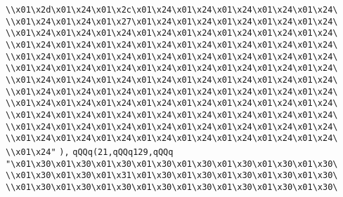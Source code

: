 \verb|\\x01\x2d\x01\x24\x01\x2c\x01\x24\x01\x24\x01\x24\x01\x24\x01\x24\|\newline
\verb|\\x01\x24\x01\x24\x01\x27\x01\x24\x01\x24\x01\x24\x01\x24\x01\x24\|\newline
\verb|\\x01\x24\x01\x24\x01\x24\x01\x24\x01\x24\x01\x24\x01\x24\x01\x24\|\newline
\verb|\\x01\x24\x01\x24\x01\x24\x01\x24\x01\x24\x01\x24\x01\x24\x01\x24\|\newline
\verb|\\x01\x24\x01\x24\x01\x24\x01\x24\x01\x24\x01\x24\x01\x24\x01\x24\|\newline
\verb|\\x01\x24\x01\x24\x01\x24\x01\x24\x01\x24\x01\x24\x01\x24\x01\x24\|\newline
\verb|\\x01\x24\x01\x24\x01\x24\x01\x24\x01\x24\x01\x24\x01\x24\x01\x24\|\newline
\verb|\\x01\x24\x01\x24\x01\x24\x01\x24\x01\x24\x01\x24\x01\x24\x01\x24\|\newline
\verb|\\x01\x24\x01\x24\x01\x24\x01\x24\x01\x24\x01\x24\x01\x24\x01\x24\|\newline
\verb|\\x01\x24\x01\x24\x01\x24\x01\x24\x01\x24\x01\x24\x01\x24\x01\x24\|\newline
\verb|\\x01\x24\x01\x24\x01\x24\x01\x24\x01\x24\x01\x24\x01\x24\x01\x24\|\newline
\verb|\\x01\x24\x01\x24\x01\x24\x01\x24\x01\x24\x01\x24\x01\x24\x01\x24\|\newline
\verb|\\x01\x24"|\newline
\verb|),|\newline
\verb|qQQq(21,qQQq129,qQQq|\newline
\verb|"\x01\x30\x01\x30\x01\x30\x01\x30\x01\x30\x01\x30\x01\x30\x01\x30\|\newline
\verb|\\x01\x30\x01\x30\x01\x31\x01\x30\x01\x30\x01\x30\x01\x30\x01\x30\|\newline
\verb|\\x01\x30\x01\x30\x01\x30\x01\x30\x01\x30\x01\x30\x01\x30\x01\x30\|\newline

